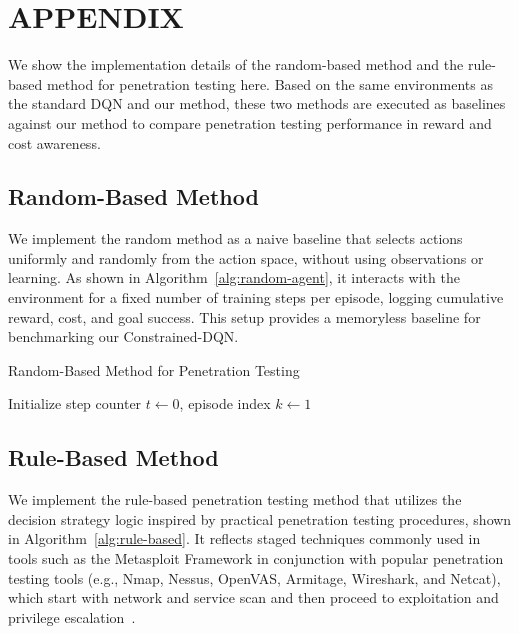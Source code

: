 \section*{\uppercase{Appendix}}
\label{sec:appendix}
We show the implementation details of the random-based method and the rule-based method for penetration testing here. Based on the same environments as the standard DQN and our method, these two methods are executed as baselines against our method to compare penetration testing performance in reward and cost awareness.



\subsection*{Random-Based Method}
We implement the random method as a naive baseline that selects actions uniformly and randomly from the action space, without using observations or learning. As shown in Algorithm~\ref{alg:random-agent}, it interacts with the environment for a fixed number of training steps per episode, logging cumulative reward, cost, and goal success. This setup provides a memoryless baseline for benchmarking our Constrained-DQN.

\begin{algorithm}[ht]
\small
\caption{Random-Based Method for Penetration Testing}
\label{alg:random-agent}


Initialize step counter $t \gets 0$, episode index $k \gets 1$\;
\end{algorithm}


\subsection*{Rule-Based Method}
We implement the rule-based penetration testing method that utilizes the decision strategy logic inspired by practical penetration testing procedures, shown in Algorithm~\ref{alg:rule-based}. It reflects staged techniques commonly used in tools such as the Metasploit Framework in conjunction with popular penetration testing tools (e.g., Nmap, Nessus, OpenVAS, Armitage, Wireshark, and Netcat), which start with network and service scan and then proceed to exploitation and privilege escalation~\cite{Ralph2019pentestIOT,Raj2020Metasploit,Malkapurapu2023Metasploit,jeff2024penOverview,Skandylas2025pentest}.



